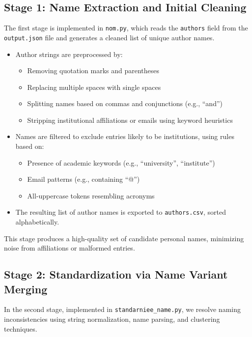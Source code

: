 \documentclass[12pt]{article}
\begin{document}
\subsection{Stage 1: Name Extraction and Initial Cleaning}

The first stage is implemented in \texttt{nom.py}, which reads the \texttt{authors} field from the \texttt{output.json} file and generates a cleaned list of unique author names.

\begin{itemize}
    \item Author strings are preprocessed by:
        \begin{itemize}
            \item Removing quotation marks and parentheses
            \item Replacing multiple spaces with single spaces
            \item Splitting names based on commas and conjunctions (e.g., ``and'')
            \item Stripping institutional affiliations or emails using keyword heuristics
        \end{itemize}
    \item Names are filtered to exclude entries likely to be institutions, using rules based on:
        \begin{itemize}
            \item Presence of academic keywords (e.g., ``university'', ``institute'')
            \item Email patterns (e.g., containing ``@'')
            \item All-uppercase tokens resembling acronyms
        \end{itemize}
    \item The resulting list of author names is exported to \texttt{authors.csv}, sorted alphabetically.
\end{itemize}

This stage produces a high-quality set of candidate personal names, minimizing noise from affiliations or malformed entries.

\subsection{Stage 2: Standardization via Name Variant Merging}

In the second stage, implemented in \texttt{standarniee\_name.py}, we resolve naming inconsistencies using string normalization, name parsing, and clustering techniques.
\end{document}
